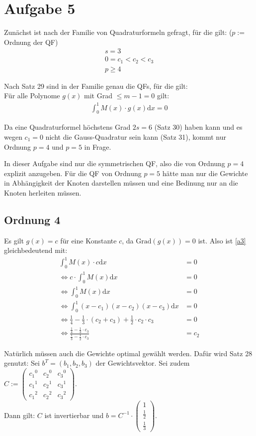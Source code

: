 \section*{Aufgabe 5}

Zunächst ist nach der Familie von Quadraturformeln gefragt, für die gilt: ($p := $ Ordnung der QF)
\begin{align}
	s = 3 \\
	0 = c_1 < c_2 < c_3 \\
	p \ge 4
\end{align}

Nach Satz 29 sind in der Familie genau die QFs, für die gilt: \\
Für alle Polynome $g(x)$ mit Grad $\le m-1 = 0$ gilt:
\begin{align}
	 \int_0^1 M(x) \cdot g(x) \mathrm{d}x = 0 \label{a3}
\end{align}

Da eine Quadraturformel höchstens Grad $2s=6$ (Satz 30) haben kann und es wegen
$c_1 = 0$ nicht die Gauss-Quadratur sein kann (Satz 31), kommt nur Ordnung $p=4$
und $p=5$ in Frage.

In dieser Aufgabe sind nur die symmetrischen QF, also die von Ordnung
$p=4$ explizit anzugeben. Für die QF von Ordnung $p=5$ hätte man nur 
die Gewichte in Abhängigkeit der Knoten darstellen müssen und
eine Bedinung nur an die Knoten herleiten müssen.

\subsection*{Ordnung 4}
Es gilt $g(x) = c$ für eine Konstante $c$, da $\text{Grad}(g(x))=0$ ist. 
Also ist \ref{a3} gleichbedeutend mit:
\begin{align}
	 \int_0^1 M(x) \cdot c \mathrm{d}x &= 0 \\
	 \Leftrightarrow c \cdot \int_0^1 M(x) \mathrm{d}x &= 0 \\
 	 \Leftrightarrow \int_0^1 M(x) \mathrm{d}x &= 0 \\
 	 \Leftrightarrow \int_0^1 (x-c_1)(x-c_2)(x-c_3) \mathrm{d}x &= 0 \\
 	 \Leftrightarrow \frac{1}{4} - \frac{1}{3} \cdot (c_2 + c_3) + \frac{1}{2} \cdot c_2 \cdot c_3 &= 0 \\
 	 \Leftrightarrow \frac{\frac{1}{4} - \frac{1}{3} \cdot c_3}
 	                      {\frac{1}{3} - \frac{1}{2} \cdot c_3} &= c_2
\end{align}

Natürlich müssen auch die Gewichte optimal gewählt werden. Dafür wird Satz 28 genutzt:
Sei $b^T = (b_1, b_2, b_3)$ der Gewichtsvektor. Sei zudem $C :=
\begin{pmatrix}
    {c_1}^0 & {c_2}^0 & {c_3}^0 \\
    {c_1}^1 & {c_2}^1 & {c_3}^1 \\
    {c_1}^2 & {c_2}^2 & {c_3}^2
\end{pmatrix}
$. \\
Dann gilt: $C$ ist invertierbar und $b = C^{-1} \cdot
\begin{pmatrix}
    1 \\
    \frac{1}{2} \\
    \frac{1}{3}
\end{pmatrix}
$.

